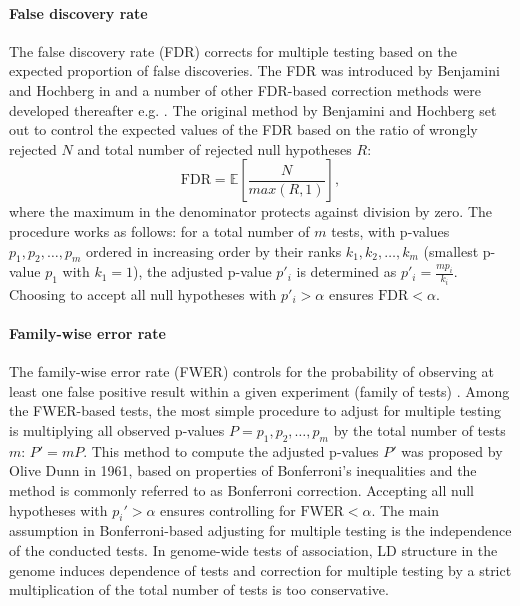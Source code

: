 \paragraph{False discovery rate}
The false discovery rate (FDR) corrects for multiple testing based on the expected proportion of false discoveries. The FDR was introduced by Benjamini and Hochberg in \parencite*{Benjamini1995} and a number of other FDR-based correction methods were developed thereafter e.g. \citep{Storey2002,Donoho2006,Sarkar2007}. The original method by Benjamini and Hochberg set out to control the expected values of the FDR based on the ratio of wrongly rejected \(N\) and total number of rejected null hypotheses \(R\):
\begin{equation}
\text{FDR} = \mathbb{E} \left[\frac{N}{max\left(R,1\right)} \right],
\end{equation}
where the maximum in the denominator protects against division by zero. The procedure works as follows: for a total number of \(m\) tests, with p-values \(p_1, p_2, \dots, p_m\) ordered in increasing order by their ranks  \(k_1, k_2, \dots, k_m\) (smallest p-value \(p_1\) with \(k_1=1\)), the adjusted p-value \(p'_i\) is determined as \(p'_i = \frac{mp_i}{k_i}\). Choosing to accept all null hypotheses with \(p'_i > \alpha\) ensures \(\text{FDR} < \alpha\). 

\paragraph{Family-wise error rate}
The family-wise error rate (FWER) controls for the probability of observing at least one false positive result within a given experiment (family of tests) \citep{Shaffer1995}. Among the FWER-based tests, the most simple procedure to adjust for multiple testing is multiplying all observed p-values \(P=p_1, p_2, \dots, p_m\) by the total number of tests \(m\): \(P' = mP\). This method to compute the adjusted p-values \(P'\) was proposed by Olive Dunn in 1961, based on properties of Bonferroni's inequalities \citep{Dunn1961} and the method is commonly referred to as Bonferroni correction. Accepting all null hypotheses with \(p_i' > \alpha\) ensures controlling for \(\text{FWER} < \alpha\). The main assumption in Bonferroni-based adjusting for multiple testing is the independence of the conducted tests. In genome-wide tests of association, LD structure in the genome induces dependence of tests and correction for multiple testing by a strict multiplication of the total number of tests is too conservative. 

